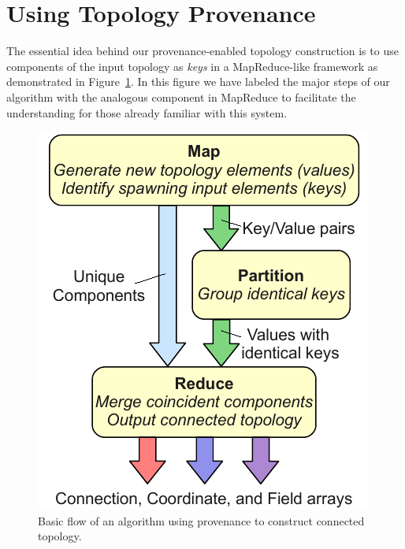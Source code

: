 \documentclass[10pt,journal,cspaper,compsoc]{IEEEtran}
\begin{document}
\section{Using Topology Provenance}
\label{sec:UsingTopologyProvenance}

The essential idea behind our provenance-enabled topology construction is
to use components of the input topology as \emph{keys} in a MapReduce-like
framework as demonstrated in Figure~\ref{fig:ProvenanceFlow}.  In this
figure we have labeled the major steps of our algorithm with the analogous
component in MapReduce to facilitate the understanding for those already
familiar with this system.

\begin{figure}[htb]
\centering
  \includegraphics[width=0.75\linewidth]{MapPartitionReduce.pdf}
  \caption{Basic flow of an algorithm using provenance to construct
    connected topology.}
  \label{fig:ProvenanceFlow}
\end{figure}
\end{document}

